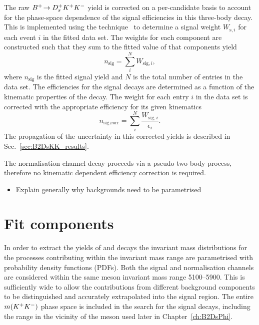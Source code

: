 The raw ${{{B}^+}}\!\rightarrow {\ensuremath{{D}^+_{s}}}{\ensuremath{{K}^+}}{\ensuremath{{K}^-}}$ yield is corrected on a per-candidate basis to account for the phase-space dependence of the signal efficiencies in this three-body decay. This is implemented using the \sPlot technique~\cite{Pivk:2004ty} to determine a signal weight $W_{\text{s},i}$ for each event $i$ in the fitted data set. The weights for each component are constructed such that they sum to the fitted value of that components yield
\begin{equation}
n_{\text{sig}} = \sum_{i}^{N} W_{\text{sig},i},
\end{equation}
where $n_{\text{sig}}$ is the fitted signal yield and $N$ is the total number of entries in the data set.
The efficiencies for the \decay{\Bp}{\Dsp\Kp\Km} signal decays are determined as a function of the kinematic properties of the decay. The weight for each entry $i$ in the data set is corrected with the appropriate efficiency for its given kinematics
\begin{equation}
n_{\text{sig},\text{corr}} = \sum_{i}^{N} \frac{W_{\text{sig},i}}{\epsilon_{i}}.
\label{eq:B2DsKK_corrected_yield}
\end{equation}
The propagation of the uncertainty in this corrected yields is described in Sec.~\ref{sec:B2DsKK_results}.

The normalisation channel decay proceeds via a pseudo two-body process, therefore no kinematic dependent efficiency correction is required.  


{\color{Red}
\begin{itemize}
\item Explain generally why backgrounds need to be parametrised 
\end{itemize}
}



\section{Fit components}
\label{sec:B2DsKK_fitcomps}

In order to extract the yields of \decay{\Bp}{\Dsp\Dzb} and \decay{\Bp}{\Dsp\Kp\Km} decays the invariant mass distributions for the processes contributing within the invariant mass range are parametrised with probability density functions (PDFs).
Both the signal and normalisation channels are considered within the same \Bp meson invariant mass range 5100--5900\mevcc. This is sufficiently wide to allow the contributions from different background components to be distinguished and accurately extrapolated into the signal region. The entire $m({{K}^+}{{K}^-})$ phase space is included in the search for the signal decays, including the range in the vicinity of the \phiz meson used later in Chapter~\ref{ch:B2DsPhi}. 



